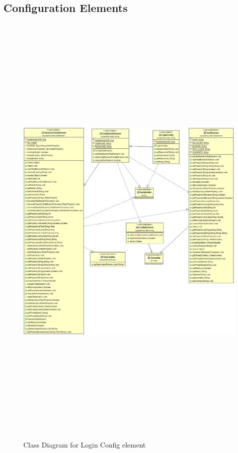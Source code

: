 \documentclass[12pt]{book}
\begin{document}
  \subsection{Configuration Elements}
  \begin{figure}[H]
   \centering
   \includegraphics[width=17cm, height=22cm]{images/configelement_login}
   \caption{Class Diagram for Login Config element\label{fig:fig4_JMeter}}
  \end{figure}
  
\end{document}
